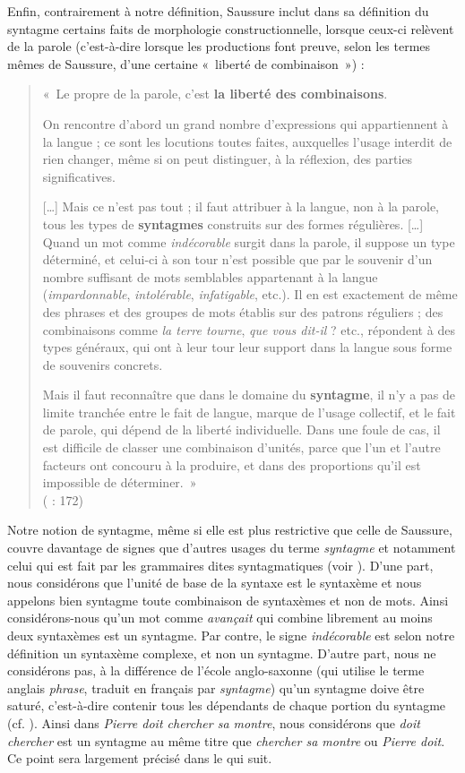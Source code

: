 {    Enfin, contrairement à notre définition, Saussure inclut dans sa définition du syntagme certains faits de morphologie constructionnelle, lorsque ceux-ci relèvent de la parole (c’est-à-dire lorsque les productions font preuve, selon les termes mêmes de Saussure, d’une certaine «~liberté de combinaison~») :

    \begin{quote}
    «~Le propre de la parole, c’est \textbf{la liberté des combinaisons}.

    On rencontre d’abord un grand nombre d’expressions qui appartiennent à la langue ; ce sont les locutions toutes faites, auxquelles l’usage interdit de rien changer, même si on peut distinguer, à la réflexion, des parties significatives.

    […] Mais ce n’est pas tout ; il faut attribuer à la langue, non à la parole, tous les types de \textbf{syntagmes} construits sur des formes régulières. […] Quand un mot comme \textit{indécorable} surgit dans la parole, il suppose un type déterminé, et celui-ci à son tour n’est possible que par le souvenir d’un nombre suffisant de mots semblables appartenant à la langue (\textit{impardonnable}, \textit{intolérable}, \textit{infatigable}, etc.). Il en est exactement de même des phrases et des groupes de mots établis sur des patrons réguliers ; des combinaisons comme \textit{la terre tourne}, \textit{que vous dit-il} ? etc., répondent à des types généraux, qui ont à leur tour leur support dans la langue sous forme de souvenirs concrets.

    Mais il faut reconnaître que dans le domaine du \textbf{syntagme}, il n’y a pas de limite tranchée entre le fait de langue, marque de l’usage collectif, et le fait de parole, qui dépend de la liberté individuelle. Dans une foule de cas, il est difficile de classer une combinaison d’unités, parce que l’un et l’autre facteurs ont concouru à la produire, et dans des proportions qu’il est impossible de déterminer.~»\\
    (\citealt{Saussure1916} : 172)
    \end{quote}

    Notre notion de syntagme, même si elle est plus restrictive que celle de Saussure, couvre davantage de signes que d’autres usages du terme \textit{syntagme} et notamment celui qui est fait par les grammaires dites syntagmatiques (voir ). D’une part, nous considérons que l’unité de base de la syntaxe est le syntaxème et nous appelons bien syntagme toute combinaison de syntaxèmes et non de mots. Ainsi considérons-nous qu’un mot comme \textit{avançait} qui combine librement au moins deux syntaxèmes est un syntagme. Par contre, le signe \textit{indécorable} est selon notre définition un syntaxème complexe, et non un syntagme. D’autre part, nous ne considérons pas, à la différence de l’école anglo-saxonne (qui utilise le terme anglais \textit{phrase}, traduit en français par \textit{syntagme}) qu’un syntagme doive être saturé, c’est-à-dire contenir tous les dépendants de chaque portion du syntagme (cf. ). Ainsi dans \textit{Pierre doit chercher sa montre}, nous considérons que \textit{doit chercher} est un syntagme au même titre que \textit{chercher sa montre} ou \textit{Pierre doit}. Ce point sera largement précisé dans le  qui suit.
}
